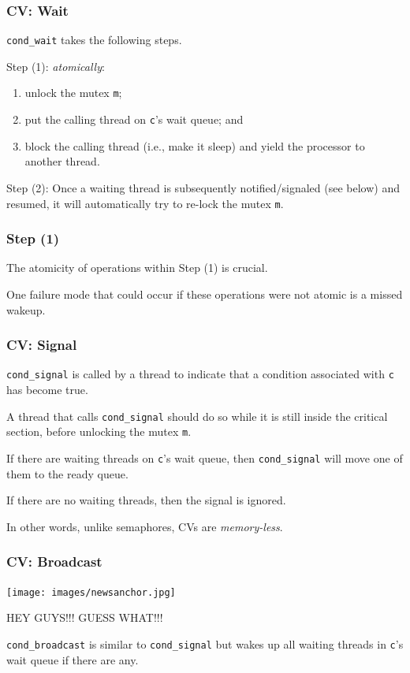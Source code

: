 \begin{frame}
	\frametitle{CV: Wait}

	\texttt{cond\_wait} takes the following steps.

	Step (1): \emph{atomically}:
	\begin{enumerate}
		\item unlock the mutex \texttt{m};
    	\item put the calling thread on \texttt{c}'s wait queue; and
    	\item block the calling thread (i.e., make it sleep) and yield the processor to another thread.
	\end{enumerate}

	Step (2): Once a waiting thread is subsequently notified/signaled (see below) and resumed, it will automatically try to re-lock the mutex \texttt{m}.

\end{frame}

\begin{frame}
	\frametitle{Step (1)}

	The atomicity of operations within Step (1) is crucial.

	One failure mode that could occur if these operations were not atomic is a \alert{missed wakeup}.

\end{frame}

\begin{frame}
	\frametitle{CV: Signal}

	\texttt{cond\_signal} is called by a thread to indicate that a condition associated with \texttt{c} has become true.

	A thread that calls \texttt{cond\_signal} should do so while it is still inside the critical section, before unlocking the mutex \texttt{m}.

	If there are waiting threads on \texttt{c}'s wait queue, then \texttt{cond\_signal} will move one of them to the ready queue.

	If there are no waiting threads, then the signal is ignored.

	In other words, unlike semaphores, CVs are \emph{memory-less}.

\end{frame}

\begin{frame}
	\frametitle{CV: Broadcast}

	\begin{center}
		\texttt{[image: images/newsanchor.jpg]}

		{HEY GUYS!!! GUESS WHAT!!!}
	\end{center}

	\texttt{cond\_broadcast} is similar to \texttt{cond\_signal} but wakes up all waiting threads in \texttt{c}'s wait queue if there are any.

\end{frame}

